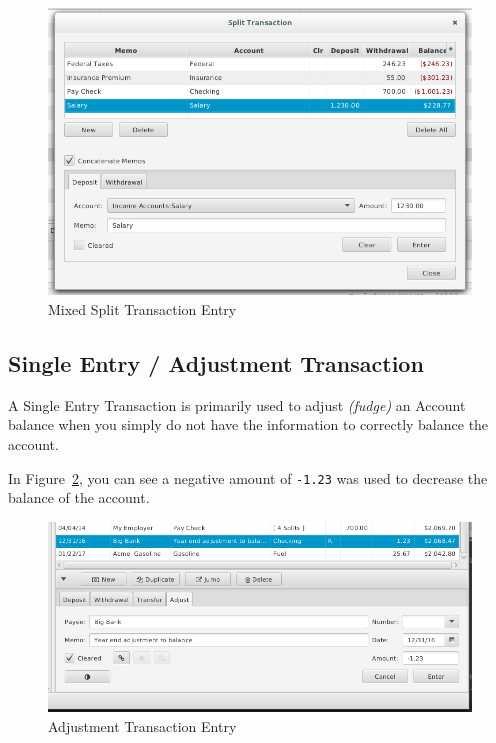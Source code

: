 \documentclass[letterpaper,12pt]{book}
\begin{document}

    \begin{figure}[H]        
        \caption{Mixed Split Transaction Entry} \label{fig:mixed-split-trans}
        \includegraphics[width=1.0\linewidth]{images/mixedSplitTransaction}               
    \end{figure}

    \subsection{Single Entry / Adjustment Transaction}\label{subsec:single-entry-/-adjustment-transaction}
    A Single Entry Transaction is primarily used to adjust \textit{(fudge)} an Account balance when you simply do not
    have the information to correctly balance the account.

    In Figure~\ref{fig:adjustment-trans}, you can see a negative amount of \texttt{-1.23} was used to decrease the balance of the account.

    \begin{figure}[H]
        \caption{Adjustment Transaction Entry} \label{fig:adjustment-trans}
        \includegraphics[width=1.0\linewidth]{images/adjustmentTransaction}
    \end{figure}
\end{document}
